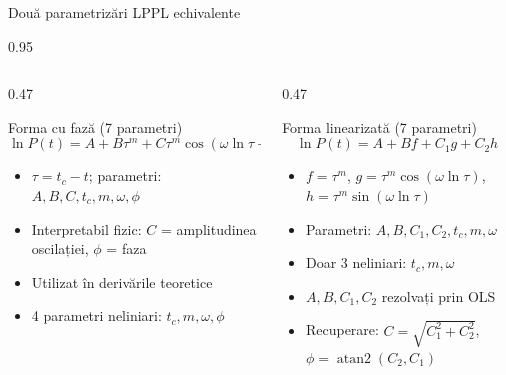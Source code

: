 \documentclass[9pt, aspectratio=169, t]{beamer}
\begin{document}
\begin{frame}{Două parametrizări LPPL echivalente}
    \begin{cminipage}{0.95\textwidth}
    {\footnotesize
    \begin{columns}[T]
        \begin{column}{0.47\textwidth}
            \begin{block}{Forma cu fază (7 parametri)}
                \begin{equation*}
                    \ln P(t) = A + B\tau^m + C\tau^m \cos(\omega \ln\tau - \phi)
                \end{equation*}
                \begin{itemize}\setlength{\itemsep}{0pt}
                    \item $\tau = t_c - t$; parametri: $A, B, C, t_c, m, \omega, \phi$
                    \item Interpretabil fizic: $C$ = amplitudinea oscilației, $\phi$ = faza
                    \item Utilizat în derivările teoretice
                    \item 4 parametri neliniari: $t_c, m, \omega, \phi$
                \end{itemize}
            \end{block}
        \end{column}
        \begin{column}{0.47\textwidth}
            \begin{alertblock}{Forma linearizată (7 parametri)}
                \begin{equation*}
                    \ln P(t) = A + Bf + C_1 g + C_2 h
                \end{equation*}
                \begin{itemize}\setlength{\itemsep}{0pt}
                    \item $f = \tau^m$, $g = \tau^m\cos(\omega\ln\tau)$, $h = \tau^m\sin(\omega\ln\tau)$
                    \item Parametri: $A, B, C_1, C_2, t_c, m, \omega$
                    \item Doar 3 neliniari: $t_c, m, \omega$
                    \item $A, B, C_1, C_2$ rezolvați prin OLS
                    \item Recuperare: $C = \sqrt{C_1^2 + C_2^2}$, $\phi = \operatorname{atan2}(C_2, C_1)$
                \end{itemize}
            \end{alertblock}
        \end{column}
    \end{columns}

}
\end{cminipage}
\end{frame}
\end{document}
